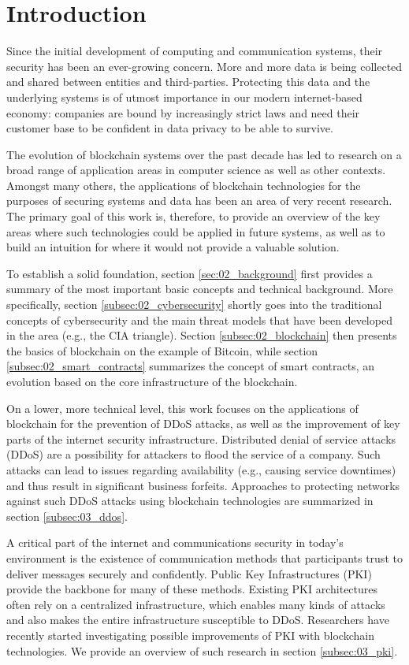 \section{Introduction}

Since the initial development of computing and communication systems, their security has been an ever-growing concern. More and more data is being collected and shared between entities and third-parties. Protecting this data and the underlying systems is of utmost importance in our modern internet-based economy: companies are bound by increasingly strict laws and need their customer base to be confident in data privacy to be able to survive.

The evolution of blockchain systems over the past decade has led to research on a broad range of application areas in computer science as well as other contexts. Amongst many others, the applications of blockchain technologies for the purposes of securing systems and data has been an area of very recent research. The primary goal of this work is, therefore, to provide an overview of the key areas where such technologies could be applied in future systems, as well as to build an intuition for where it would not provide a valuable solution.

To establish a solid foundation, section \ref{sec:02_background} first provides a summary of the most important basic concepts and technical background. More specifically, section \ref{subsec:02_cybersecurity} shortly goes into the traditional concepts of cybersecurity and the main threat models that have been developed in the area (e.g., the CIA triangle). Section \ref{subsec:02_blockchain} then presents the basics of blockchain on the example of Bitcoin, while section \ref{subsec:02_smart_contracts} summarizes the concept of smart contracts, an evolution based on the core infrastructure of the blockchain.

On a lower, more technical level, this work focuses on the applications of blockchain for the prevention of DDoS attacks, as well as the improvement of key parts of the internet security infrastructure. Distributed denial of service attacks (DDoS) are a possibility for attackers to flood the service of a company. Such attacks can lead to issues regarding availability (e.g., causing service downtimes) and thus result in significant business forfeits. Approaches to protecting networks against such DDoS attacks using blockchain technologies are summarized in section \ref{subsec:03_ddos}.

A critical part of the internet and communications security in today's environment is the existence of communication methods that participants trust to deliver messages securely and confidently. Public Key Infrastructures (PKI) provide the backbone for many of these methods. Existing PKI architectures often rely on a centralized infrastructure, which enables many kinds of attacks and also makes the entire infrastructure susceptible to DDoS. Researchers have recently started investigating possible improvements of PKI with blockchain technologies. We provide an overview of such research in section \ref{subsec:03_pki}.


